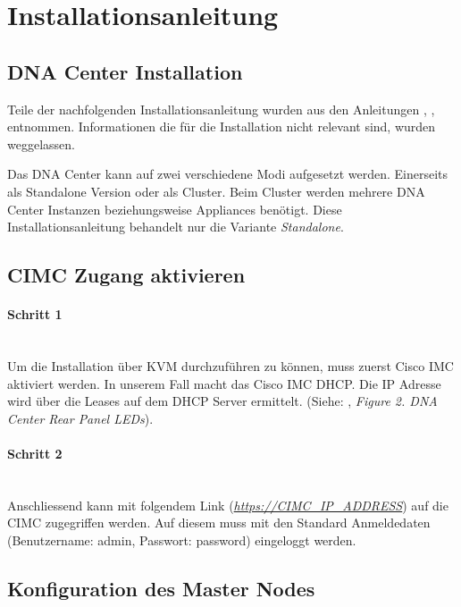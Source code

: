 \section{Installationsanleitung}

\subsection{DNA Center Installation}
Teile der nachfolgenden Installationsanleitung wurden aus den Anleitungen \cite{cisco-dna-installation-guide-1-2-chapter-configure}, \cite{cisco-dna-installation-guide}, \cite{cisco-dna-installation-guide-1-2-chapter-install} entnommen. Informationen die für die Installation nicht relevant sind, wurden weggelassen. 

Das DNA Center kann auf zwei verschiedene Modi aufgesetzt werden. Einerseits als Standalone Version oder als Cluster. Beim Cluster werden mehrere DNA Center Instanzen beziehungsweise Appliances benötigt. Diese Installationsanleitung behandelt nur die Variante \textit{Standalone}.

\subsection{CIMC Zugang aktivieren}
\paragraph{Schritt 1}
\label{installguide-cimc-step1}
~\\
Um die Installation über KVM durchzuführen zu können, muss zuerst Cisco IMC aktiviert werden. In unserem Fall macht das Cisco IMC DHCP. Die IP Adresse wird über die Leases auf dem DHCP Server ermittelt. (Siehe: \cite{cisco-dna-installation-guide-1-2-chapter-install}, \textit{Figure 2. DNA Center Rear Panel LEDs}). 

\paragraph{Schritt 2}
~\\
Anschliessend kann mit folgendem Link (\textit{\url{https://CIMC\_IP\_ADDRESS}}) auf die CIMC zugegriffen werden. Auf diesem muss mit den Standard Anmeldedaten (Benutzername: admin, Passwort: password) eingeloggt werden. 

\subsection{Konfiguration des Master Nodes}

